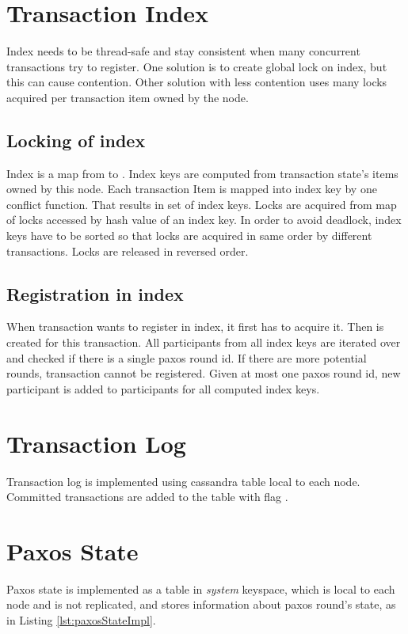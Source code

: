 \section{Transaction Index}
Index needs to be thread-safe and stay consistent when many concurrent transactions try to register. One solution is to create global lock on index, but this can cause contention. Other solution with less contention uses many locks acquired per transaction item owned by the node. 

\subsection{Locking of index}
Index is a map from  to . Index keys are computed from transaction state’s items owned by this node. Each transaction Item is mapped into index key by one conflict function. That results in set of index keys. Locks are acquired from map of locks accessed by hash value of an index key. In order to avoid deadlock, index keys have to be sorted so that locks are acquired in same order by different transactions. Locks are released in reversed order.


\subsection{Registration in index}
When transaction wants to register in index, it first has to acquire it. Then  is created for this transaction. All participants from all index keys are iterated over and checked if there is a single paxos round id. If there are more potential rounds, transaction cannot be registered. Given at most one paxos round id, new participant is added to participants for all computed index keys.



\section{Transaction Log}
Transaction log is implemented using cassandra table local to each node. 
Committed transactions are added to the table with flag . 


\section{Paxos State}
Paxos state is implemented as a table in \emph{system} keyspace, which is local to each node and is not replicated, and stores information about paxos round's state, as in Listing \ref{lst:paxosStateImpl}.

